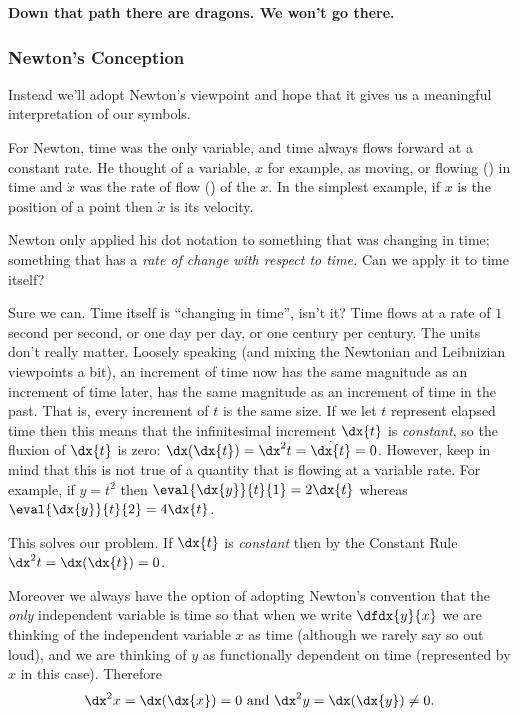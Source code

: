 \begin{Digression}
   \vskip2mm{}
  \centerline{\bf{} Down that path there are dragons. We won't
    go there.} %


  \subsubsection*{Newton's Conception}
  Instead we'll adopt Newton's viewpoint and hope that it gives us a
  meaningful interpretation of our symbols.
  
  For Newton, time was the only variable, and time always flows forward
  at a constant rate. He thought of a variable, $x$ for
  example, as moving, or flowing () in time and
  $\dot{x}$ was the rate of flow () of the
   $x$. In the simplest example, if $x$ is the position
  of a point then $\dot{x}$ is its velocity.

  Newton only applied his dot notation to something that was changing
  in time; something that has a \emph{rate of change with respect to
    time.} Can we apply it to time itself?

  Sure we can. Time itself is ``changing in time'', isn't it? Time
  flows at a rate of $1$ second per second, or one day per day, or one
  century per century. The units don't really matter. Loosely speaking
  (and mixing the Newtonian and Leibnizian viewpoints a bit), an
  increment of time now has the same magnitude as an increment of time
  later, has the same magnitude as an increment of time in the
  past. That is, every increment of $t$ is the same size.  If we let
  $t$ represent elapsed time then this means that the infinitesimal
  increment $\dx{t}$ is \emph{constant}, so the fluxion of $\dx{t}$ is
  zero: $\dx(\dx{t})=\dx^2{t}=\dot{\dx{t}}=0$.  However, keep in mind
  that this is not true of a quantity that is
  flowing at a variable rate. For example, if $y=t^2$ then
  $\eval{\dx{y}}{t}{1}=2\dx{t}$ whereas $\eval{\dx{y}}{t}{2}=4\dx{t}$.

  This solves our problem. If $\dx{t}$ is \emph{constant} then by the
  Constant Rule $\dx^2{t}=\dx(\dx{t})=0$.

  Moreover we always have the option of adopting Newton's convention
  that the \emph{only} independent variable is time so that when we
  write $\dfdx{y}{x}$ we are thinking of  the independent
  variable $x$ as time (although we rarely say so out loud), and we are
  thinking of $y$ as functionally dependent on time (represented by
  $x$ in this case).  Therefore
  $$\dx^2x=\dx(\dx{x})=0 \text{ and } \dx^2y=\dx(\dx{y})\neq0.$$


\end{Digression}
